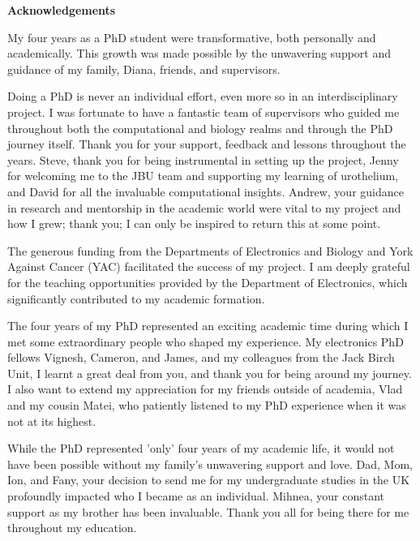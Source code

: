 \thispagestyle{plain}
\begin{center}
    \Large        
    \textbf{Acknowledgements}
    \vspace{0.9cm}

\end{center}
 


My four years as a PhD student were transformative, both personally and academically. This growth was made possible by the unwavering support and guidance of my family, Diana, friends, and supervisors. 

Doing a PhD is never an individual effort, even more so in an interdisciplinary project. I was fortunate to have a fantastic team of supervisors who guided me throughout both the computational and biology realms and through the PhD journey itself. Thank you for your support, feedback and lessons throughout the years. Steve, thank you for being instrumental in setting up the project, Jenny for welcoming me to the JBU team and supporting my learning of urothelium, and David for all the invaluable computational insights. Andrew, your guidance in research and mentorship in the academic world were vital to my project and how I grew; thank you; I can only be inspired to return this at some point.

The generous funding from the Departments of Electronics and Biology and York Against Cancer (YAC) facilitated the success of my project. I am deeply grateful for the teaching opportunities provided by the Department of Electronics, which significantly contributed to my academic formation.

The four years of my PhD represented an exciting academic time during which I met some extraordinary people who shaped my experience. My electronics PhD fellows Vignesh, Cameron, and James, and my colleagues from the Jack Birch Unit, I learnt a great deal from you, and thank you for being around my journey. I also want to extend my appreciation for my friends outside of academia, Vlad and my cousin Matei, who patiently listened to my PhD experience when it was not at its highest.

While the PhD represented 'only' four years of my academic life, it would not have been possible without my family's unwavering support and love. Dad, Mom, Ion, and Fany, your decision to send me for my undergraduate studies in the UK profoundly impacted who I became as an individual. Mihnea, your constant support as my brother has been invaluable. Thank you all for being there for me throughout my education.

